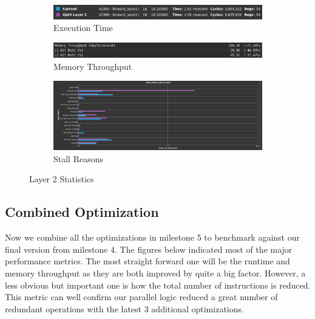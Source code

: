 \documentclass{article}
\begin{document}
\begin{figure}[H]
    \centering
    \begin{subfigure}[b]{\linewidth}
        \includegraphics[width=\linewidth]{half_layer2_summary}
        \caption{Execution Time}
    \end{subfigure}
    \begin{subfigure}[b]{\linewidth}
        \includegraphics[width=\linewidth]{half_layer2_mem}
        \caption{Memory Throughput}
    \end{subfigure}
    \begin{subfigure}[b]{\linewidth}
        \includegraphics[width=\linewidth]{half_layer2_warp}
        \caption{Stall Reasons}
    \end{subfigure}
    \caption{Layer 2 Statistics}
\end{figure}

\subsection{Combined Optimization}
Now we combine all the optimizations in milestone 5 to benchmark against our
final version from milestone 4. The figures below indicated most of the major performance
metrics. The most straight forward one will be the runtime and memory throughput as they
are both improved by quite a big factor. However, a less obvious but important one is
how the total number of instructions is reduced. This metric can well confirm our
parallel logic reduced a great number of redundant operations with the latest 3
additional optimizations.
\end{document}
